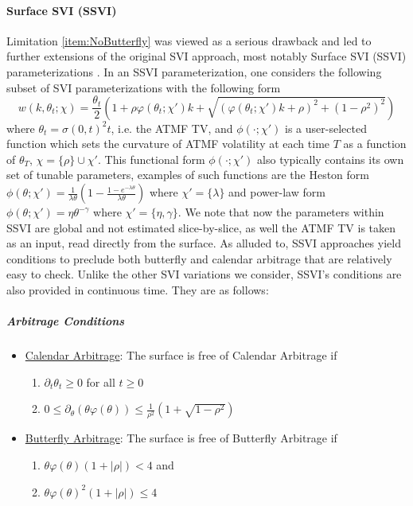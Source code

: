 \documentclass[11pt,letterpaper]{article}
\begin{document}
\paragraph{Surface SVI (SSVI)}
Limitation \ref{item:NoButterfly} was viewed as a serious drawback and led to further extensions of the original SVI approach, most notably Surface SVI (SSVI) parameterizations \cite{gatheral2014arbitrage}. In an SSVI parameterization, one considers the following subset of SVI parameterizations with the following form
\[
w(k,\theta_t; \chi) = \frac{\theta_t}{2} \left( 1 + \rho \varphi(\theta_t; \chi') k + \sqrt{ (\varphi(\theta_t;\chi')k + \rho)^2 + (1 - \rho^2)^2   }        \right) 
\]
where $\theta_t = \sigma(0,t)^2 t$, i.e. the ATMF TV, and $\phi(\cdot; \chi')$ is a user-selected function which sets the curvature of ATMF volatility at each time $T$ as a function of $\theta_T$, $\chi = \{\rho\} \cup \chi'$. This functional form $\phi(\cdot; \chi')$ also typically contains its own set of tunable parameters, examples of such functions are the Heston form $\phi(\theta; \chi') = \frac{1}{\lambda \theta} \left( 1 - \frac{1 - e^{-\lambda \theta} }{\lambda \theta }  \right)$ where $\chi' = \{\lambda\}$ and power-law form $\phi(\theta; \chi') = \eta \theta^{-\gamma}$ where $\chi' = \{\eta,\gamma\}$. We note that now the parameters within SSVI are global and not estimated slice-by-slice, as well the ATMF TV is taken as an input, read directly from the surface. As alluded to, SSVI approaches yield conditions to preclude both butterfly and calendar arbitrage that are relatively easy to check. Unlike the other SVI variations we consider, SSVI's conditions are also provided in continuous time. They are as follows:
\subparagraph{Arbitrage Conditions}
\begin{itemize}
\item \underline{Calendar Arbitrage}: The surface is free of Calendar Arbitrage if 
\begin{enumerate}
\item $\partial_t \theta_t \geq 0$ for all $t \geq 0$
\item $0 \leq \partial_{\theta}( \theta \varphi(\theta) ) \leq \frac{1}{\rho^2} \left(  1 + \sqrt{1 - \rho^2 } \right)  $
\end{enumerate}
\item \underline{Butterfly Arbitrage}: The surface is free of Butterfly Arbitrage if 
\begin{enumerate}
\item $\theta \varphi(\theta) ( 1 + |\rho| ) < 4 $ and
\item $\theta \varphi(\theta)^2 (1 + |\rho| ) \leq 4 $
\end{enumerate}
\end{itemize}
\end{document}
